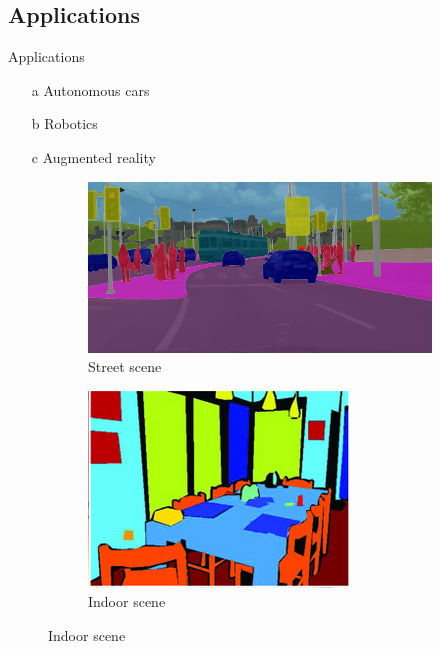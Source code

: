 \documentclass{beamer}
\begin{document}
\subsection{Applications}
\begin{frame}{Applications}
	\begin{itemize}
  \item[a] {
    Autonomous cars
  }
  \item[b] {
    Robotics
  }
  \item[c] {
    Augmented reality
  }
  \end{itemize}
  
  \begin{figure}
		\begin{subfigure}{0.3\textwidth}
			\centering
			\includegraphics[width=0.95\linewidth]{images/auto_driving}
			\captionsetup{justification=centering,margin=0.2cm}
			\caption{Street scene \cite{cityscapes}}
		\end{subfigure}
		\begin{subfigure}{0.3\textwidth}
			\centering
			\includegraphics[width=0.8\linewidth]{images/indoor}
			\captionsetup{justification=centering,margin=0.2cm}
			\caption{Indoor scene \cite{indoor}}

\end{subfigure}
\end{figure}
\end{frame}
\end{document}
